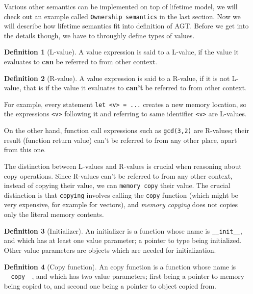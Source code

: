 \documentclass[times, utf8, diplomski]{fer}
\theoremstyle{definition}
\newtheorem{definition}{Definition}[]
\begin{document}
Various other semantics can be implemented on top of lifetime model, we will check out an example called
\texttt{Ownership semantics} in the last section. Now we will describe how lifetime semantics fit into
definition of AGT. Before we get into the details though, we have to throughly define types of values.

\begin{definition}[L-value]
A value expression is said to a L-value, 
if the value it evaluates to \textbf{can} be referred to from other context.
\end{definition}

\begin{definition}[R-value]
A value expression is said to a R-value, if it is not L-value, that is
if the value it evaluates to \textbf{can't} be referred to from other context.
\end{definition}

For example, every statement \texttt{let <v> = ...} creates a new memory location,
so the expressions \texttt{<v>} following it and referring to same identifier \texttt{<v>} are L-values.

On the other hand, function call expressions such as \texttt{gcd(3,2)} are R-values; their result
(function return value) can't be referred to from any other place, apart from this one.

The distinction between L-values and R-values is crucial when reasoning about copy operations.
Since R-values can't be referred to from any other context, instead of copying their value, 
we can \texttt{memory copy} their value. The crucial distinction is that \texttt{copying}
involves calling the \texttt{copy} function (which might be very expensive, for example for vectors),
and \textit{memory copying} does not copies only the literal memory contents.

\begin{definition}[Initializer]
An initializer is a function whose name is \texttt{\_\_init\_\_}, and which has at least one value parameter;
a pointer to type being initialized. Other value parameters are objects which are needed for initialization.
\end{definition}

\begin{definition}[Copy function]
An copy function is a function whose name is \texttt{\_\_copy\_\_}, and which has two value parameters;
first being a pointer to memory being copied to, and second one being a pointer to object copied from.
\end{definition}
\end{document}
